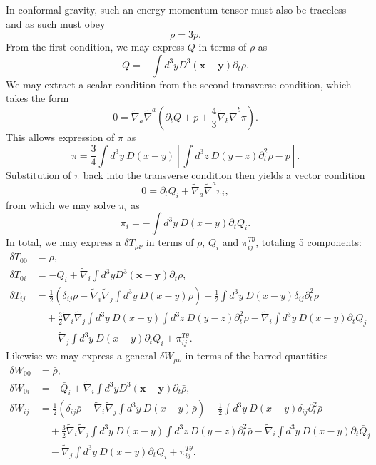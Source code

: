 \documentclass[10pt,letterpaper]{article}
\begin{document}
In conformal gravity, such an energy momentum tensor must also be traceless and as such must obey
\begin{equation}
\rho = 3p.
\end{equation}
From the first condition, we may express $Q$ in terms of $\rho$ as
\begin{equation}
Q = -\int d^3y D^3(\mathbf x-\mathbf y) \partial_t  \rho.
\end{equation}
We may extract a scalar condition from the second transverse condition, which takes the form
\begin{equation}
0 = \tilde\nabla_a\tilde\nabla^a (\partial_t Q +  p + \frac43 \tilde\nabla_b\tilde\nabla^b \pi).
\end{equation}
This allows expression of $\pi$ as
\begin{equation}
\pi = \frac34 \int d^3y\ D(x-y) \left[ \int d^3z\ D(y-z) \partial_t ^2 \rho - p\right].
\end{equation}
Substitution of $\pi$ back into the transverse condition then yields a vector condition
\begin{equation}
0=\partial_t Q_i + \tilde\nabla_a\tilde\nabla^a \pi_i,
\end{equation}
from which we may solve $\pi_i$ as
\begin{equation}
\pi_i = -\int d^3y\ D(x-y)\partial_t Q_i.
\end{equation}
In total, we may express a $\delta T_{\mu\nu}$ in terms of $\rho$, $Q_i$ and $\pi_{ij}^{T\theta}$, totaling 5 components:
\begin{align}
 \delta T_{00}  &= \rho,
\nonumber\\	
 \delta T_{0i} &= -Q_i + \tilde\nabla_i \int d^3y D^3(\mathbf x-\mathbf y) \partial_t  \rho,
\nonumber\\	
\delta T_{ij}  &= \frac12 \left( \delta_{ij}\rho - \tilde\nabla_i \tilde\nabla_j \int d^3y\ D(x-y) \rho\right) - \frac12 \int d^3y\ D(x-y) \delta_{ij} \partial_t^2 \rho 
\nonumber\\
&\quad {}+  \frac32
\tilde\nabla_i\tilde\nabla_j  \int d^3y\ D(x-y) \int d^3z\ D(y-z) \partial_t^2 \rho - \tilde\nabla_i  \int d^3y\ D(x-y) \partial_t Q_j
\nonumber \\
&\quad{}
- \tilde\nabla_j  \int d^3y\ D(x-y) \partial_t Q_i + \pi_{ij}^{T\theta}.
\end{align} 
Likewise we may express a general $\delta W_{\mu\nu}$ in terms of the barred quantities 
\begin{align}
 \delta W_{00}  &= \bar \rho,
\nonumber\\	
 \delta W_{0i} &= -\bar Q_i + \tilde\nabla_i \int d^3y D^3(\mathbf x-\mathbf y) \partial_t  \bar \rho,
\nonumber\\	
 \delta W_{ij}  &= \frac12 \left( \delta_{ij}\bar \rho - \tilde\nabla_i \tilde\nabla_j \int d^3y\ D(x-y) \bar \rho\right) - \frac12 \int d^3y\ D(x-y) \delta_{ij} \partial_t^2 \bar \rho 
\nonumber\\
&\quad {}+  \frac32
\tilde\nabla_i\tilde\nabla_j  \int d^3y\ D(x-y) \int d^3z\ D(y-z) \partial_t^2 \bar \rho - \tilde\nabla_i  \int d^3y\ D(x-y) \partial_t \bar Q_j
\nonumber \\
&\quad{}
- \tilde\nabla_j  \int d^3y\ D(x-y) \partial_t \bar Q_i + \bar \pi_{ij}^{T\theta}.
\end{align} 
\end{document}
